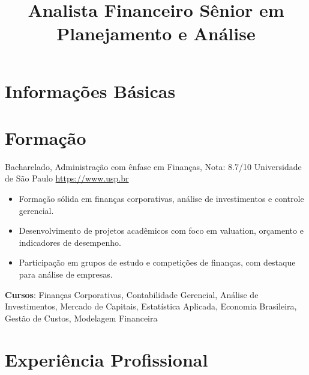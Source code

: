 \documentclass[a4paper, serif, 10pt]{moderncv}
\title{Analista Financeiro Sênior em Planejamento e Análise}
\begin{document}
\maketitle

\section{Informações Básicas}

\section{Formação}

        {Bacharelado, Administração com ênfase em Finanças, Nota: 8.7/10}
        {Universidade de São Paulo}
        {\url{https://www.usp.br}}
        {}
        {\begin{itemize}
\item Formação sólida em finanças corporativas, análise de investimentos e controle gerencial.
\item Desenvolvimento de projetos acadêmicos com foco em valuation, orçamento e indicadores de desempenho.
\item Participação em grupos de estudo e competições de finanças, com destaque para análise de empresas.
\end{itemize}
\textbf{Cursos}: Finanças Corporativas, Contabilidade Gerencial, Análise de Investimentos, Mercado de Capitais, Estatística Aplicada, Economia Brasileira, Gestão de Custos, Modelagem Financeira}
\section{Experiência Profissional}
\end{document}
